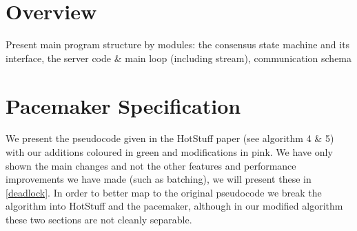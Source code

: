 
\section{Overview}
Present main program structure by modules: the consensus state machine and its interface, the server code \& main loop (including stream), communication schema
\section{Pacemaker Specification} \label{spec}
We present the pseudocode given in the HotStuff paper (see algorithm 4 \& 5) with our additions coloured in green and modifications in pink. We have only shown the main changes and not the other features and performance improvements we have made (such as batching), we will present these in \ref{deadlock}. In order to better map to the original pseudocode we break the algorithm into HotStuff and the pacemaker, although in our modified algorithm these two sections are not cleanly separable.

